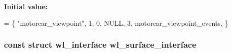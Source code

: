 {\bfseries Initial value\-:}
\begin{DoxyCode}
= \{
    \textcolor{stringliteral}{"motorcar\_viewpoint"}, 1,
    0, NULL,
    3, motorcar\_viewpoint\_events,
\}
\end{DoxyCode}
\hypertarget{protocol_2motorcar-wayland-extensions_8c_ab5b94bcc25b21d2fdd945533016d0e33}{
\subsubsection[{wl\-\_\-surface\-\_\-interface}]{\setlength{\rightskip}{0pt plus 5cm}const struct wl\-\_\-interface wl\-\_\-surface\-\_\-interface}}\label{protocol_2motorcar-wayland-extensions_8c_ab5b94bcc25b21d2fdd945533016d0e33}

